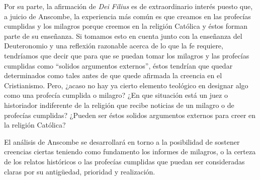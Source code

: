 Por su parte, la afirmación de \emph{Dei Filius} es de extraordinario interés
puesto que, a juicio de Anscombe, la experiencia más común es que creamos en las
profecías cumplidas y los milagros porque creemos en la religión Católica y
éstos forman parte de su enseñanza. Si tomamos esto en cuenta junto con la
enseñanza del Deuteronomio y una reflexión razonable acerca de lo que la fe
requiere, tendríamos que decir que para que se puedan tomar los milagros y las
profecías cumplidas como \enquote{solidos argumentos externos}, éstos tendrían
que quedar determinados como tales antes de que quede afirmada la creencia en el
Cristianismo. Pero, ¿acaso no hay ya cierto elemento teológico en designar algo
como una profecía cumplida o milagro? ¿En que situación está un juez o
historiador indiferente de la religión que recibe noticias de un milagro o de
profecías cumplidas? ¿Pueden ser éstos solidos argumentos externos para creer en
la religión Católica?

El análisis de Anscombe se desarrollará en torno a la posibilidad de sostener
creencias ciertas teniendo como fundamento los informes de milagros, o la
certeza de los relatos históricos o las profecías cumplidas que puedan ser
consideradas claras por su antigüedad, prioridad y realización.

